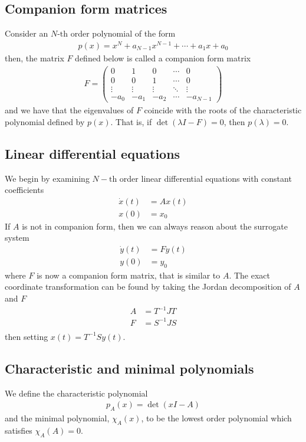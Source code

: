 \documentclass[a4paper,11pt]{exam}
\newcounter{ct}
\begin{document}
\begin{questions}
\subsection{Companion form matrices}
Consider an $N\text{-th}$ order polynomial of the form
\begin{align}
    p(x) = x^N + a_{N-1} x^{N-1} + \cdots + a_1 x + a_0
\end{align}
then, the matrix $F$ defined below is called a companion form matrix
\begin{align}
    F = \begin{pmatrix} 0 & 1 & 0 & \cdots & 0\\
                        0 & 0 & 1 & \cdots & 0\\
                        \vdots & \vdots & \vdots & \ddots & \vdots\\
                        -a_0 & -a_1 & -a_2 & \cdots & -a_{N-1}\end{pmatrix}
\end{align}
and we have that the eigenvalues of $F$ coincide with the roots of the characteristic polynomial defined by $p(x)$.  That is, if $\det(\lambda I - F) = 0$, then $p(\lambda) = 0$.  
\subsection{Linear differential equations}
We begin by examining $N-\text{th}$ order linear differential equations with constant coefficients
\begin{align}
    \dot{x}(t) &= A x(t)\\
    x(0) &= x_0
\end{align}
If $A$ is not in companion form, then we can always reason about the surrogate system
\begin{align}
    \dot{y}(t) &= F y(t)\\
    y(0) &= y_0
\end{align}
where $F$ is now a companion form matrix, that is similar to $A$.  The exact coordinate transformation can be found by taking the Jordan decomposition of $A$ and $F$
\begin{align}
    A &= T^{-1} J T\\
    F &= S^{-1} J S\\
\end{align}
then setting $x(t) = T^{-1} S y(t)$.
\subsection{Characteristic and minimal polynomials}
We define the characteristic polynomial 
\begin{align}
    p_{A}(x) = \det \left( x I - A \right)
\end{align}
and the minimal polynomial, $\chi_A(x)$, to be the lowest order polynomial which satisfies $\chi_A(A) = 0$.


\end{questions}
\end{document}
